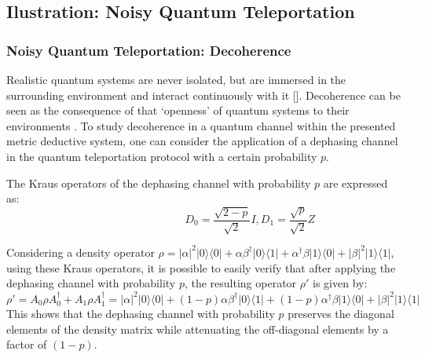 \subsection{Ilustration: Noisy Quantum Teleportation}


\subsubsection{Noisy Quantum Teleportation: Decoherence}


Realistic quantum systems are never isolated, but are immersed
in the surrounding environment and interact continuously with it [\cite{schlosshauer2005decoherence}]. Decoherence can be seen as the consequence of that  `openness' of quantum systems to their  environments .  To study decoherence in a quantum channel within the presented metric deductive system, one can consider the application of a dephasing channel in the quantum teleportation protocol with a certain probability $p$.

The Kraus operators of the dephasing channel with probability $p$ are expressed as:
\begin{equation}
    \hspace{100pt} D_{0}= \frac{\sqrt{2-p}}{\sqrt{2}} I,  D_{1}= \frac{\sqrt{p}}{\sqrt{2}} Z
\end{equation}

Considering a density operator $\rho=|\alpha|^{2} |0\rangle \langle 0 | + \alpha \beta^{\dag} |0\rangle \langle 1 | + \alpha^{\dag} \beta |1\rangle \langle 0 | + |\beta|^{2} |1\rangle \langle 1 |$, using these Kraus operators, it is possible to easily verify  that after applying the dephasing channel with probability $p$, the resulting operator $\rho'$ is given by: 
\begin{equation} \label{eq:dephasing_result}
     \rho' =  A_{0} \rho A_{0}^{\dag} + A_{1} \rho A_{1}^{\dag} = |\alpha|^{2} |0\rangle \langle 0 | +  (1-p) \alpha \beta^{\dag} |0\rangle \langle 1 | +  (1-p) \alpha^{\dag}  \beta |1\rangle \langle 0 | + |\beta|^{2} |1\rangle \langle 1 | 
\end{equation}
This shows that the dephasing channel with probability $p$ preserves the diagonal elements of the density matrix while attenuating the off-diagonal elements by a factor of $(1-p)$.

